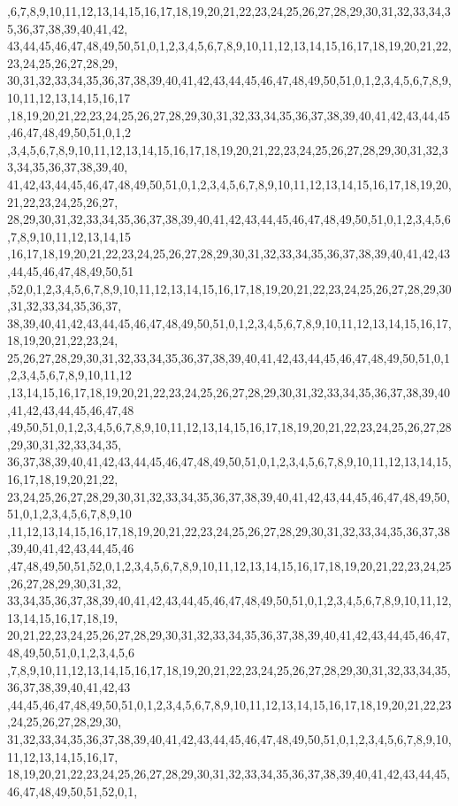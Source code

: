 \begin{DoxyCode}
      ,6,7,8,9,10,11,12,13,14,15,16,17,18,19,20,21,22,23,24,25,26,27,28,29,30,31,32,33,34,35,36,37,38,39,40,41,42,
      43,44,45,46,47,48,49,50,51,0,1,2,3,4,5,6,7,8,9,10,11,12,13,14,15,16,17,18,19,20,21,22,23,24,25,26,27,28,29,
      30,31,32,33,34,35,36,37,38,39,40,41,42,43,44,45,46,47,48,49,50,51,0,1,2,3,4,5,6,7,8,9,10,11,12,13,14,15,16,17
      ,18,19,20,21,22,23,24,25,26,27,28,29,30,31,32,33,34,35,36,37,38,39,40,41,42,43,44,45,46,47,48,49,50,51,0,1,2
      ,3,4,5,6,7,8,9,10,11,12,13,14,15,16,17,18,19,20,21,22,23,24,25,26,27,28,29,30,31,32,33,34,35,36,37,38,39,40,
      41,42,43,44,45,46,47,48,49,50,51,0,1,2,3,4,5,6,7,8,9,10,11,12,13,14,15,16,17,18,19,20,21,22,23,24,25,26,27,
      28,29,30,31,32,33,34,35,36,37,38,39,40,41,42,43,44,45,46,47,48,49,50,51,0,1,2,3,4,5,6,7,8,9,10,11,12,13,14,15
      ,16,17,18,19,20,21,22,23,24,25,26,27,28,29,30,31,32,33,34,35,36,37,38,39,40,41,42,43,44,45,46,47,48,49,50,51
      ,52,0,1,2,3,4,5,6,7,8,9,10,11,12,13,14,15,16,17,18,19,20,21,22,23,24,25,26,27,28,29,30,31,32,33,34,35,36,37,
      38,39,40,41,42,43,44,45,46,47,48,49,50,51,0,1,2,3,4,5,6,7,8,9,10,11,12,13,14,15,16,17,18,19,20,21,22,23,24,
      25,26,27,28,29,30,31,32,33,34,35,36,37,38,39,40,41,42,43,44,45,46,47,48,49,50,51,0,1,2,3,4,5,6,7,8,9,10,11,12
      ,13,14,15,16,17,18,19,20,21,22,23,24,25,26,27,28,29,30,31,32,33,34,35,36,37,38,39,40,41,42,43,44,45,46,47,48
      ,49,50,51,0,1,2,3,4,5,6,7,8,9,10,11,12,13,14,15,16,17,18,19,20,21,22,23,24,25,26,27,28,29,30,31,32,33,34,35,
      36,37,38,39,40,41,42,43,44,45,46,47,48,49,50,51,0,1,2,3,4,5,6,7,8,9,10,11,12,13,14,15,16,17,18,19,20,21,22,
      23,24,25,26,27,28,29,30,31,32,33,34,35,36,37,38,39,40,41,42,43,44,45,46,47,48,49,50,51,0,1,2,3,4,5,6,7,8,9,10
      ,11,12,13,14,15,16,17,18,19,20,21,22,23,24,25,26,27,28,29,30,31,32,33,34,35,36,37,38,39,40,41,42,43,44,45,46
      ,47,48,49,50,51,52,0,1,2,3,4,5,6,7,8,9,10,11,12,13,14,15,16,17,18,19,20,21,22,23,24,25,26,27,28,29,30,31,32,
      33,34,35,36,37,38,39,40,41,42,43,44,45,46,47,48,49,50,51,0,1,2,3,4,5,6,7,8,9,10,11,12,13,14,15,16,17,18,19,
      20,21,22,23,24,25,26,27,28,29,30,31,32,33,34,35,36,37,38,39,40,41,42,43,44,45,46,47,48,49,50,51,0,1,2,3,4,5,6
      ,7,8,9,10,11,12,13,14,15,16,17,18,19,20,21,22,23,24,25,26,27,28,29,30,31,32,33,34,35,36,37,38,39,40,41,42,43
      ,44,45,46,47,48,49,50,51,0,1,2,3,4,5,6,7,8,9,10,11,12,13,14,15,16,17,18,19,20,21,22,23,24,25,26,27,28,29,30,
      31,32,33,34,35,36,37,38,39,40,41,42,43,44,45,46,47,48,49,50,51,0,1,2,3,4,5,6,7,8,9,10,11,12,13,14,15,16,17,
      18,19,20,21,22,23,24,25,26,27,28,29,30,31,32,33,34,35,36,37,38,39,40,41,42,43,44,45,46,47,48,49,50,51,52,0,1,

\end{DoxyCode}
